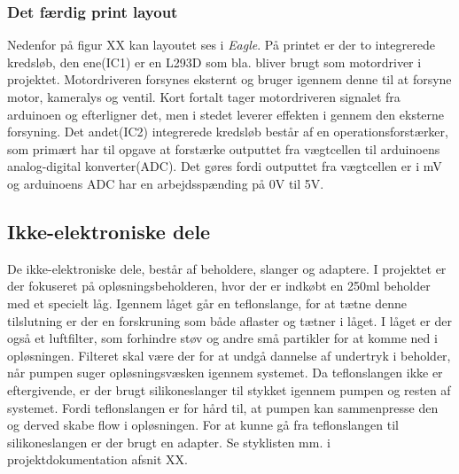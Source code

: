 \subsubsection{Det færdig print layout}
Nedenfor på figur XX kan layoutet ses i \textit{Eagle}. På printet er der to integrerede kredsløb, den ene(IC1) er en L293D som bla. bliver brugt som motordriver i projektet. Motordriveren forsynes eksternt og bruger igennem denne til at forsyne motor, kameralys og ventil. Kort fortalt tager motordriveren signalet fra arduinoen og efterligner det, men i stedet leverer effekten i gennem den eksterne forsyning. Det andet(IC2) integrerede kredsløb består af en operationsforstærker, som primært har til opgave at forstærke outputtet fra vægtcellen til arduinoens analog-digital konverter(ADC). Det gøres fordi outputtet fra vægtcellen er i mV og arduinoens ADC har en arbejdsspænding på 0V til 5V.  

\subsection{Ikke-elektroniske dele}
De ikke-elektroniske dele, består af beholdere, slanger og adaptere. I projektet er der fokuseret på opløsningsbeholderen, hvor der er indkøbt en 250ml beholder med et specielt låg. Igennem låget går en teflonslange, for at tætne denne tilslutning er der en forskruning som både aflaster og tætner i låget. I låget er der også et luftfilter, som forhindre støv og andre små partikler for at komme ned i opløsningen. Filteret skal være der for at undgå dannelse af undertryk i beholder, når pumpen suger opløsningsvæsken igennem systemet. Da teflonslangen ikke er eftergivende, er der brugt silikoneslanger til stykket igennem pumpen og resten af systemet. Fordi teflonslangen er for hård til, at pumpen kan sammenpresse den og derved skabe flow i opløsningen. For at kunne gå fra teflonslangen til silikoneslangen er der brugt en adapter. Se styklisten mm. i projektdokumentation afsnit XX.


